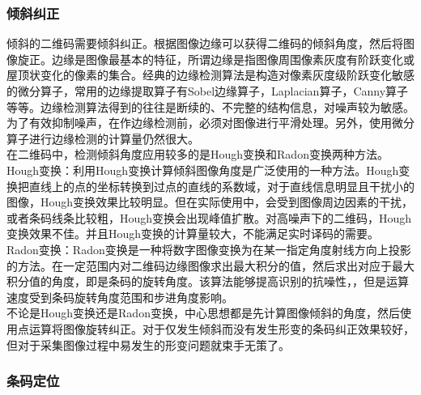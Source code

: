 \subsubsection{倾斜纠正}
倾斜的二维码需要倾斜纠正。根据图像边缘可以获得二维码的倾斜角度，然后将图像旋正。边缘是图像最基本的特征，所谓边缘是指图像周围像素灰度有阶跃变化或屋顶状变化的像素的集合。经典的边缘检测算法是构造对像素灰度级阶跃变化敏感的微分算子，常用的边缘提取算子有Sobel边缘算子，Laplacian算子，Canny算子等等\cite{7}。边缘检测算法得到的往往是断续的、不完整的结构信息，对噪声较为敏感。为了有效抑制噪声，在作边缘检测前，必须对图像进行平滑处理。另外，使用微分算子进行边缘检测的计算量仍然很大。\\
在二维码中，检测倾斜角度应用较多的是Hough变换和Radon变换两种方法。\\
Hough变换：利用Hough变换计算倾斜图像角度是广泛使用的一种方法。Hough变换把直线上的点的坐标转换到过点的直线的系数域，对于直线信息明显且干扰小的图像，Hough变换效果比较明显\cite{7}。但在实际使用中，会受到图像周边因素的干扰，或者条码线条比较粗，Hough变换会出现峰值扩散。对高噪声下的二维码，Hough变换效果不佳。并且Hough变换的计算量较大，不能满足实时译码的需要。\\
Radon变换：Radon变换是一种将数字图像变换为在某一指定角度射线方向上投影的方法\cite{7}。在一定范围内对二维码边缘图像求出最大积分的值，然后求出对应于最大积分值的角度，即是条码的旋转角度。该算法能够提高识别的抗噪性，，但是运算速度受到条码旋转角度范围和步进角度影响。\\
不论是Hough变换还是Radon变换，中心思想都是先计算图像倾斜的角度，然后使用点运算将图像旋转纠正。对于仅发生倾斜而没有发生形变的条码纠正效果较好，但对于采集图像过程中易发生的形变问题就束手无策了。

\subsubsection{条码定位}
